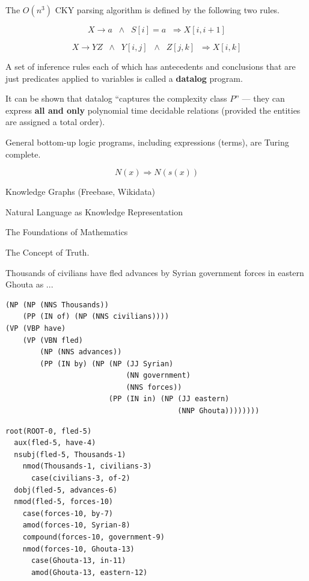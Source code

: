{\vfill
The $O(n^3)$ CKY parsing algorithm is defined by the following two rules.

$$X \rightarrow a \;\;\wedge \;\; S[i] = a \;\; \Rightarrow X[i,i+1]$$

\vfill
$$X \rightarrow YZ \;\;\wedge \;\; Y[i,j]\;\; \wedge \;\; Z[j,k] \;\;\Rightarrow X[i,k]$$


A set of inference rules each of which has antecedents and conclusions that are just predicates applied to variables is called a {\bf datalog} program.

\vfill
It can be shown that datalog ``captures the complexity class $P$'' --- they can express {\bf all and only} polynomial time decidable relations
(provided the entities are assigned a total order).

\vfill
General bottom-up logic programs, including expressions (terms), are Turing complete.

$$N(x) \Rightarrow N(s(x))$$


Knowledge Graphs (Freebase, Wikidata)

\vfill
Natural Language as Knowledge Representation

\vfill
The Foundations of Mathematics

\vfill
The Concept of Truth.


Thousands of civilians have fled advances by Syrian government forces in eastern Ghouta as ...

\begin{verbatim}
(NP (NP (NNS Thousands))
    (PP (IN of) (NP (NNS civilians))))
(VP (VBP have)
    (VP (VBN fled)
        (NP (NNS advances))
        (PP (IN by) (NP (NP (JJ Syrian)
                            (NN government)
                            (NNS forces))
                        (PP (IN in) (NP (JJ eastern)
                                        (NNP Ghouta))))))))
\end{verbatim}


\begin{verbatim}
root(ROOT-0, fled-5)
  aux(fled-5, have-4)
  nsubj(fled-5, Thousands-1)
    nmod(Thousands-1, civilians-3)
      case(civilians-3, of-2)
  dobj(fled-5, advances-6)
  nmod(fled-5, forces-10)
    case(forces-10, by-7)
    amod(forces-10, Syrian-8)
    compound(forces-10, government-9)
    nmod(forces-10, Ghouta-13)
      case(Ghouta-13, in-11)
      amod(Ghouta-13, eastern-12)
\end{verbatim}

}
